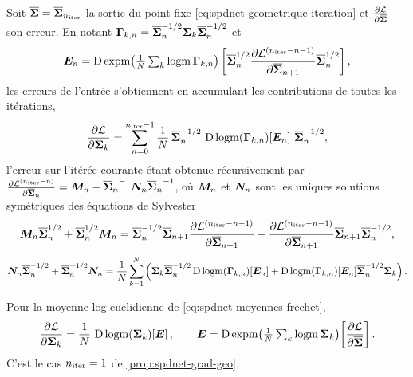 \begin{proposition}
\label{prop:spdnet-grad-geo}
  Soit $\overline{\boldsymbol{\Sigma}}=\overline{\boldsymbol{\Sigma}}_{n_{\mathrm{iter}}}$ la sortie du point fixe
  \cref{eq:spdnet-geometrique-iteration} et $\frac{\partial \mathcal{L}}{\partial \overline{\boldsymbol{\Sigma}}}$ son erreur. En
  notant $\boldsymbol{\Gamma}_{k,n}=\overline{\boldsymbol{\Sigma}}_n^{-1/2}\boldsymbol{\Sigma}_k\overline{\boldsymbol{\Sigma}}_n^{-1/2}$
  et
  \begin{equation}
    \boldsymbol{E}_n
    =
    \operatorname{\mathrm{D}}\operatorname{\operatorname{expm}}\!\left(\tfrac{1}{N}\textstyle\sum_{k}\operatorname{\operatorname{logm}}\boldsymbol{\Gamma}_{k,n}\right)
    \left[\overline{\boldsymbol{\Sigma}}_n^{1/2}\frac{\partial \mathcal{L}^{(n_{\mathrm{iter}}-n-1)}}{\partial \overline{\boldsymbol{\Sigma}}_{n+1}}\overline{\boldsymbol{\Sigma}}_n^{1/2}\right],
    \label{eq:spdnet-grad-geo-E}
  \end{equation}
  les erreurs de l'entrée s'obtiennent en accumulant les contributions de toutes
  les itérations,
  \begin{equation}
    \frac{\partial \mathcal{L}}{\partial \boldsymbol{\Sigma}_k}
    =
    \sum_{n=0}^{n_{\mathrm{iter}}-1}
    \frac{1}{N}\,
    \overline{\boldsymbol{\Sigma}}_n^{-1/2}\,
    \operatorname{\mathrm{D}}\operatorname{\operatorname{logm}}(\boldsymbol{\Gamma}_{k,n})\!\left[\boldsymbol{E}_n\right]\,
    \overline{\boldsymbol{\Sigma}}_n^{-1/2},
    \label{eq:spdnet-grad-geo}
  \end{equation}
  l'erreur sur l'itérée courante étant obtenue récursivement par
  $\frac{\partial \mathcal{L}^{(n_{\mathrm{iter}}-n)}}{\partial \overline{\boldsymbol{\Sigma}}_n}=\boldsymbol{M}_n-{\overline{\boldsymbol{\Sigma}}_n}^{-1}\boldsymbol{N}_n{\overline{\boldsymbol{\Sigma}}_n}^{-1}$,
  où $\boldsymbol{M}_n$ et $\boldsymbol{N}_n$ sont les uniques solutions symétriques des
  équations de Sylvester
  \begin{equation}
    \boldsymbol{M}_n\overline{\boldsymbol{\Sigma}}_n^{1/2}+\overline{\boldsymbol{\Sigma}}_n^{1/2}\boldsymbol{M}_n
    =
    \overline{\boldsymbol{\Sigma}}_n^{-1/2}\overline{\boldsymbol{\Sigma}}_{n+1}\frac{\partial \mathcal{L}^{(n_{\mathrm{iter}}-n-1)}}{\partial \overline{\boldsymbol{\Sigma}}_{n+1}}
    +
    \frac{\partial \mathcal{L}^{(n_{\mathrm{iter}}-n-1)}}{\partial \overline{\boldsymbol{\Sigma}}_{n+1}}\overline{\boldsymbol{\Sigma}}_{n+1}\overline{\boldsymbol{\Sigma}}_n^{-1/2},
    \label{eq:spdnet-grad-geo-M}
  \end{equation}
  \begin{equation}
    \boldsymbol{N}_n\overline{\boldsymbol{\Sigma}}_n^{-1/2}+\overline{\boldsymbol{\Sigma}}_n^{-1/2}\boldsymbol{N}_n
    =
    \frac{1}{N}\sum_{k=1}^{N}
    \left(
      \boldsymbol{\Sigma}_k\overline{\boldsymbol{\Sigma}}_n^{-1/2}\operatorname{\mathrm{D}}\operatorname{\operatorname{logm}}(\boldsymbol{\Gamma}_{k,n})[\boldsymbol{E}_n]
      +
      \operatorname{\mathrm{D}}\operatorname{\operatorname{logm}}(\boldsymbol{\Gamma}_{k,n})[\boldsymbol{E}_n]\overline{\boldsymbol{\Sigma}}_n^{-1/2}\boldsymbol{\Sigma}_k
    \right).
    \label{eq:spdnet-grad-geo-N}
  \end{equation}
\end{proposition}

\begin{proposition}
\label{prop:spdnet-grad-le}
  Pour la moyenne log-euclidienne de \cref{eq:spdnet-moyennes-frechet},
  \begin{equation}
    \frac{\partial \mathcal{L}}{\partial \boldsymbol{\Sigma}_k}
    =
    \frac{1}{N}\,\operatorname{\mathrm{D}}\operatorname{\operatorname{logm}}(\boldsymbol{\Sigma}_k)\!\left[\boldsymbol{E}\right],
    \qquad
    \boldsymbol{E}
    =
    \operatorname{\mathrm{D}}\operatorname{\operatorname{expm}}\!\left(\tfrac{1}{N}\textstyle\sum_{k}\operatorname{\operatorname{logm}}\boldsymbol{\Sigma}_k\right)\!\left[\frac{\partial \mathcal{L}}{\partial \overline{\boldsymbol{\Sigma}}}\right].
    \label{eq:spdnet-grad-le}
  \end{equation}
  C'est le cas $n_{\mathrm{iter}}=1$ de \cref{prop:spdnet-grad-geo}.
\end{proposition}


